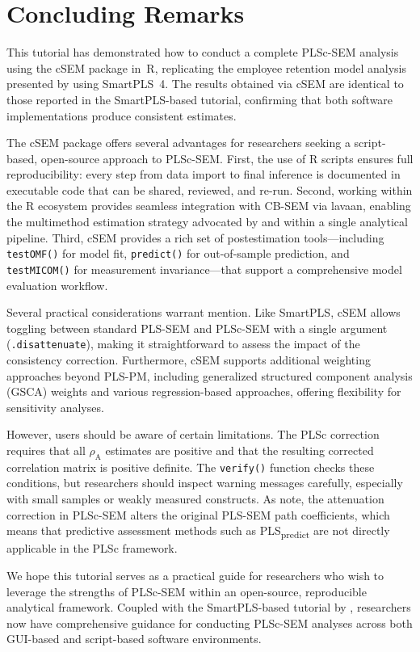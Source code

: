 \documentclass[12pt,a4paper]{article}\usepackage[]{graphicx}\usepackage[]{xcolor}
\newcommand{\pkg}[1]{\textsf{#1}}
\newcommand{\prm}[1]{\texttt{#1}}
\newcommand{\fn}[1]{\texttt{#1}}   %
\begin{document}
\section{Concluding Remarks}

This tutorial has demonstrated how to conduct a complete PLSc-SEM analysis using the \pkg{cSEM} package in~R, replicating the employee retention model analysis presented by \citet{Cheah2026} using SmartPLS~4. The results obtained via \pkg{cSEM} are identical to those reported in the SmartPLS-based tutorial, confirming that both software implementations produce consistent estimates.

The \pkg{cSEM} package offers several advantages for researchers seeking a script-based, open-source approach to PLSc-SEM. First, the use of R scripts ensures full reproducibility: every step from data import to final inference is documented in executable code that can be shared, reviewed, and re-run. Second, working within the R ecosystem provides seamless integration with CB-SEM via \pkg{lavaan}, enabling the multimethod estimation strategy advocated by \citet{Cheah2026} and \citet{Sarstedt2024} within a single analytical pipeline. Third, \pkg{cSEM} provides a rich set of postestimation tools---including \fn{testOMF()} for model fit, \fn{predict()} for out-of-sample prediction, and \fn{testMICOM()} for measurement invariance---that support a comprehensive model evaluation workflow.

Several practical considerations warrant mention. Like SmartPLS, \pkg{cSEM} allows toggling between standard PLS-SEM and PLSc-SEM with a single argument (\prm{.disattenuate}), making it straightforward to assess the impact of the consistency correction. Furthermore, \pkg{cSEM} supports additional weighting approaches beyond PLS-PM, including generalized structured component analysis (GSCA) weights and various regression-based approaches, offering flexibility for sensitivity analyses.

However, users should be aware of certain limitations. The PLSc correction requires that all $\rho_\text{A}$ estimates are positive and that the resulting corrected correlation matrix is positive definite. The \fn{verify()} function checks these conditions, but researchers should inspect warning messages carefully, especially with small samples or weakly measured constructs. As \citet{Cheah2026} note, the attenuation correction in PLSc-SEM alters the original PLS-SEM path coefficients, which means that predictive assessment methods such as PLS\textsubscript{predict} \citep{Shmueli2019} are not directly applicable in the PLSc framework.

We hope this tutorial serves as a practical guide for researchers who wish to leverage the strengths of PLSc-SEM within an open-source, reproducible analytical framework. Coupled with the SmartPLS-based tutorial by \citet{Cheah2026}, researchers now have comprehensive guidance for conducting PLSc-SEM analyses across both GUI-based and script-based software environments.

\newpage


\end{document}
